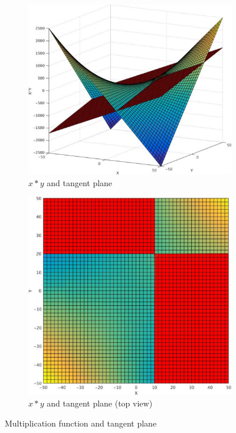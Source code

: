 \begin{figure}[ht!]
\par\bigskip
\par\bigskip
\par\bigskip
\par\bigskip
\par\bigskip
\par\bigskip
\par\bigskip
\begin{subfigure}{.5\textwidth}
  \centering
  \includegraphics[width=.9\linewidth]{./figures/phdWork_MFunc_c.pdf}
  \caption{$x \ast y$ and tangent plane}
  \label{fig:sfig1}
\end{subfigure}%
\begin{subfigure}{.5\textwidth}
  \centering
  \includegraphics[width=.9\linewidth]{./figures/phdWork_MFunc_d.pdf}
  \caption{$x \ast y$ and tangent plane  (top view)}
  \label{fig:sfig2}
\end{subfigure}
\caption{Multiplication function and tangent plane \cite{Cimatti:2018:ILS:3274693.3230639}}
\label{fig:Tangent_Plane_Graph}
\end{figure}\newpage


